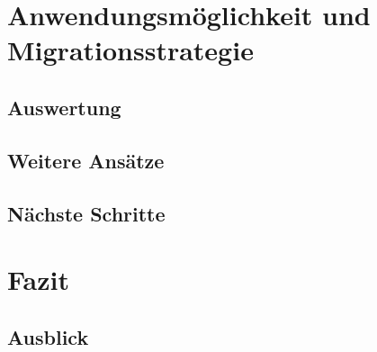 \chapter{Anwendungsmöglichkeit und Migrationsstrategie}

\section{Auswertung}

\section{Weitere Ansätze}

\section{Nächste Schritte}


\chapter{Fazit}

\section{Ausblick}
